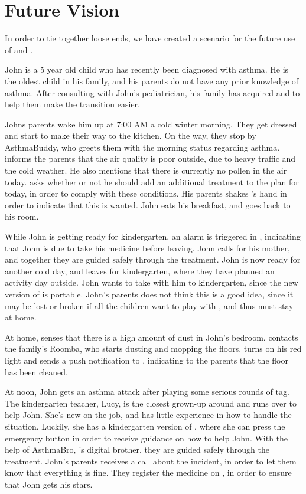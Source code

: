 \section{Future Vision}
\label{sec:futurevision}

In order to tie together loose ends, we have created a scenario for the future use of \app{} and \buddy{}.

John is a 5 year old child who has recently been diagnosed with asthma. He is the oldest child in his family, and his parents do not have any prior knowledge of asthma. After consulting with John's pediatrician, his family has acquired \buddy{} and \app{} to help them make the transition easier. 

Johns parents wake him up at 7:00 AM a cold winter morning. They get dressed and start to make their way to the kitchen. On the way, they stop by AsthmaBuddy, who greets them with the morning status regarding asthma. \buddy{} informs the parents that the air quality is poor outside, due to heavy traffic and the cold weather. He also mentions that there is currently no pollen in the air today. \buddy{} asks whether or not he should add an additional treatment to the plan for today, in order to comply with these conditions. His parents shakes \buddy{}'s hand in order to indicate that this is wanted. John eats his breakfast, and goes back to his room. 

While John is getting ready for kindergarten, an alarm is triggered in \buddy{}, indicating that John is due to take his medicine before leaving. John calls for his mother, and together they are guided safely through the treatment. John is now ready for another cold day, and leaves for kindergarten, where they have planned an activity day outside. John wants to take \ab{} with him to kindergarten, since the new version of \ab{} is portable. John's parents does not think this is a good idea, since it may be lost or broken if all the children want to play with \ab{}, and thus \ab{} must stay at home.

At home, \buddy{} senses that there is a high amount of dust in John's bedroom. \buddy{} contacts the family's Roomba, who starts dusting and mopping the floors. \buddy{} turns on his red light and sends a push notification to \app{}, indicating to the parents that the floor has been cleaned. 

At noon, John gets an asthma attack after playing some serious rounds of tag. The kindergarten teacher, Lucy, is the closest grown-up around and runs over to help John. She's new on the job, and has little experience in how to handle the situation. Luckily, she has a kindergarten version of \app{}, where she can press the emergency button in order to receive guidance on how to help John. With the help of AsthmaBro, \buddy{}'s digital brother, they are guided safely through the treatment. John's parents receives a call about the incident, in order to let them know that everything is fine. They register the medicine on \app{}, in order to ensure that John gets his stars.

